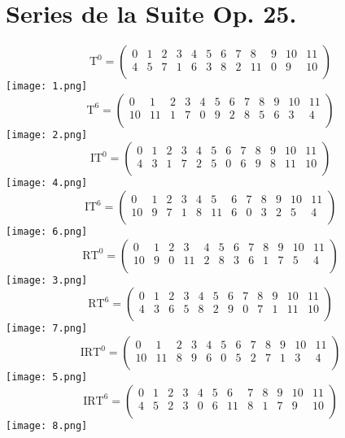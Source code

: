 \chapter{Series de la Suite Op. 25.}
	\label{app:series}
	
	\newpage
	$$\text{T}^0=\left(\begin{matrix}0&1&2&3&4&5&6&7&8&9&10&11\\4&5&7&1&6&3&8&2&11&0&9&10\\\end{matrix}\right)$$
	\texttt{[image: 1.png]}
	\vspace{1cm}
	$$\text{T}^6=\left(\begin{matrix}0&1&2&3&4&5&6&7&8&9&10&11\\10&11&1&7&0&9&2&8&5&6&3&4\\\end{matrix}\right)$$
	\texttt{[image: 2.png]}
	\vspace{1cm}
	$$\text{IT}^0=\left(\begin{matrix}0&1&2&3&4&5&6&7&8&9&10&11\\4&3&1&7&2&5&0&6&9&8&11&10\\\end{matrix}\right)$$
	\texttt{[image: 4.png]}
	\vspace{1cm}
	$$\text{IT}^6=\left(\begin{matrix}0&1&2&3&4&5&6&7&8&9&10&11\\10&9&7&1&8&11&6&0&3&2&5&4\\\end{matrix}\right)$$
	\texttt{[image: 6.png]}
	\newpage
	$$\text{RT}^0=\left(\begin{matrix}0&1&2&3&4&5&6&7&8&9&10&11\\10&9&0&11&2&8&3&6&1&7&5&4\\\end{matrix}\right)$$
	\texttt{[image: 3.png]}
	\vspace{1cm}
	$$\text{RT}^6=\left(\begin{matrix}0&1&2&3&4&5&6&7&8&9&10&11\\4&3&6&5&8&2&9&0&7&1&11&10\\\end{matrix}\right)$$
	\texttt{[image: 7.png]}
	\vspace{1cm}
	$$\text{IRT}^0=\left(\begin{matrix}0&1&2&3&4&5&6&7&8&9&10&11\\10&11&8&9&6&0&5&2&7&1&3&4\\\end{matrix}\right)$$
	\texttt{[image: 5.png]}
	\vspace{1cm}
	$$\text{IRT}^6=\left(\begin{matrix}0&1&2&3&4&5&6&7&8&9&10&11\\4&5&2&3&0&6&11&8&1&7&9&10\\\end{matrix}\right)$$
	\texttt{[image: 8.png]}